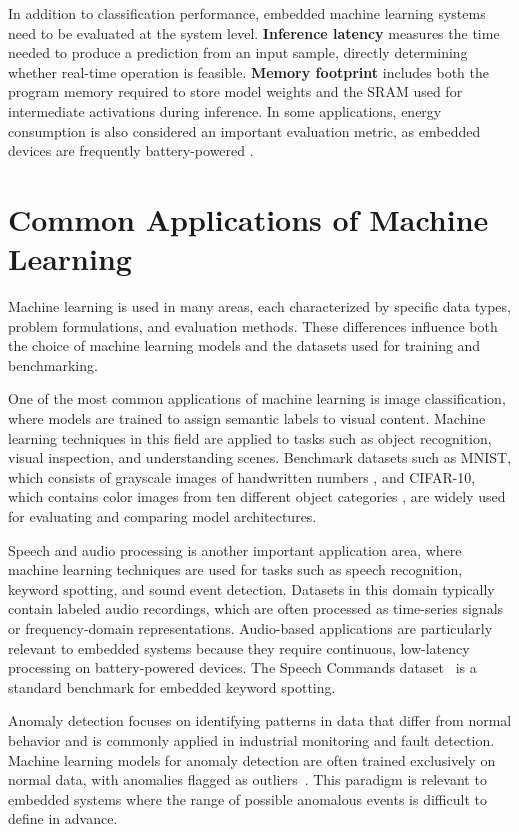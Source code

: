 In addition to classification performance, embedded machine learning systems need to be evaluated at the system level. \textbf{Inference latency} measures the time needed to produce a prediction from an input sample, directly determining whether real-time operation is feasible. \textbf{Memory footprint} includes both the program memory required to store model weights and the SRAM used for intermediate activations during inference. In some applications, energy consumption is also considered an important evaluation metric, as embedded devices are frequently battery-powered \cite{warden2019tinyml}. 

\section{Common Applications of Machine Learning}

Machine learning is used in many areas, each characterized by specific data types, problem formulations, and evaluation methods. These differences influence both the choice of machine learning models and the datasets used for training and benchmarking.

One of the most common applications of machine learning is image classification, where models are trained to assign semantic labels to visual content. Machine learning techniques in this field are applied to tasks such as object recognition, visual inspection, and understanding scenes. Benchmark datasets such as MNIST, which consists of grayscale images of handwritten numbers \cite{lecun1998mnist}, and CIFAR-10, which contains color images from ten different object categories \cite{krizhevsky2009cifar}, are widely used for evaluating and comparing model architectures.

Speech and audio processing is another important application area, where machine learning techniques are used for tasks such as speech recognition, keyword spotting, and sound event detection. Datasets in this domain typically contain labeled audio recordings, which are often processed as time-series signals or frequency-domain representations. Audio-based applications are particularly relevant to embedded systems because they require continuous, low-latency processing on battery-powered devices. The Speech Commands dataset~\cite{warden2018speech} is a standard benchmark for embedded keyword spotting.

Anomaly detection focuses on identifying patterns in data that differ from normal behavior and is commonly applied in industrial monitoring and fault detection. Machine learning models for anomaly detection are often trained exclusively on normal data, with anomalies flagged as outliers~\cite{chandola2009anomaly}. This paradigm is relevant to embedded systems where the range of possible anomalous events is difficult to define in advance. 

